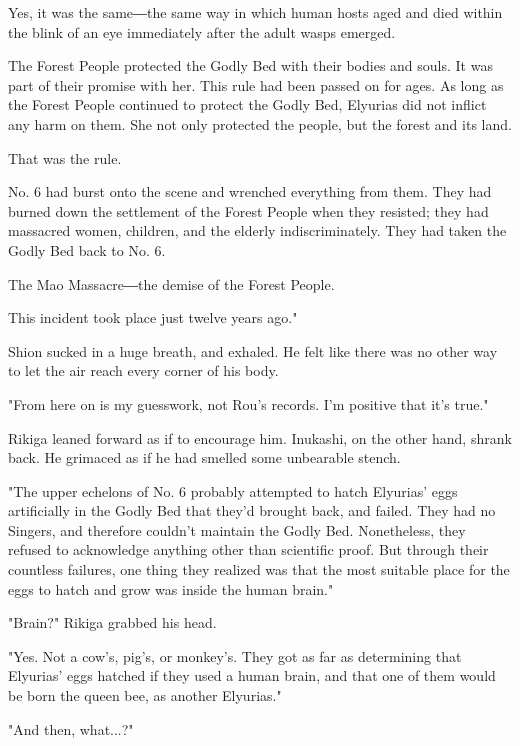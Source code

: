 Yes, it was the same―the same way in which human hosts aged and died
within the blink of an eye immediately after the adult wasps emerged.

The Forest People protected the Godly Bed with their bodies and souls.
It was part of their promise with her. This rule had been passed on for
ages. As long as the Forest People continued to protect the Godly Bed,
Elyurias did not inflict any harm on them. She not only protected the
people, but the forest and its land.

That was the rule.

No. 6 had burst onto the scene and wrenched everything from them. They
had burned down the settlement of the Forest People when they resisted;
they had massacred women, children, and the elderly indiscriminately.
They had taken the Godly Bed back to No. 6.

The Mao Massacre―the demise of the Forest People.

This incident took place just twelve years ago."

Shion sucked in a huge breath, and exhaled. He felt like there was no
other way to let the air reach every corner of his body.

"From here on is my guesswork, not Rou's records. I'm positive that it's
true."

Rikiga leaned forward as if to encourage him. Inukashi, on the other
hand, shrank back. He grimaced as if he had smelled some unbearable
stench.

"The upper echelons of No. 6 probably attempted to hatch Elyurias' eggs
artificially in the Godly Bed that they'd brought back, and failed. They
had no Singers, and therefore couldn't maintain the Godly Bed.
Nonetheless, they refused to acknowledge anything other than scientific
proof. But through their countless failures, one thing they realized was
that the most suitable place for the eggs to hatch and grow was inside
the human brain."

"Brain?" Rikiga grabbed his head.

"Yes. Not a cow's, pig's, or monkey's. They got as far as determining
that Elyurias' eggs hatched if they used a human brain, and that one of
them would be born the queen bee, as another Elyurias."

"And then, what...?"

